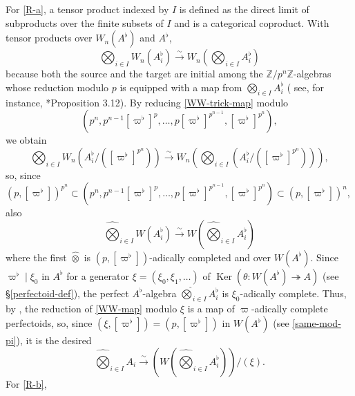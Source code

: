 \documentclass[11pt, reqno]{amsart}
\newcommand{\bZ}{\mathbb{Z}}
\DeclareMathOperator{\Ker}{Ker}		%
\newcommand{\isomto}{\overset{\sim}{\longrightarrow}}
\newcommand{\surjects}{\twoheadrightarrow}
\newcommand{\tensor}{\otimes} 			%
\newcommand{\wh}{\widehat}
\newcommand{\tst}{\textstyle}
\newcommand{\be}{\begin{equation}}
\newcommand{\ee}{\end{equation}}
\numberwithin{equation}{numberingbase}
\theoremstyle{thms}
\theoremstyle{claims}
\theoremstyle{defs}
\theoremstyle{thms}
\theoremstyle{defs}
\theoremstyle{subsection-tweak}
\theoremstyle{subsection-tweak}
\begin{document}
For \ref{R-a}, a tensor product indexed by $I$ is defined as the direct limit of subproducts over the finite subsets of $I$  and is a categorical coproduct. With tensor products over $W_n(A^\flat)$ and $A^\flat$, %
\be \label{WW-trick-map}
\tst \bigotimes_{i \in I} W_n(A_i^\flat) \isomto W_n(\bigotimes_{i \in I} A_i^\flat)
\ee
because both the source and the target are initial among the $\bZ/p^n\bZ$-algebras whose reduction modulo $p$ is equipped with a map from $ \bigotimes_{i \in I} A_i^\flat$ (%
see, for instance, \cite{SZ18}*{Proposition 3.12}). By reducing \eqref{WW-trick-map} modulo 
\[
(p^n, p^{n - 1}[\varpi^\flat]^{p}, \dotsc, p [\varpi^\flat]^{p^{n - 1}}, [\varpi^\flat]^{p^{n}}),
\]
we obtain
\[
\tst \bigotimes_{i \in I} W_n(A_i^\flat/([\varpi^\flat]^{p^{n}})) \isomto W_n(\bigotimes_{i \in I} (A_i^\flat/([\varpi^\flat]^{p^{n}}))),
\]
so, since $(p, [\varpi^\flat])^{p^n} \subset (p^n, p^{n - 1}[\varpi^\flat]^{p}, \dotsc, p [\varpi^\flat]^{p^{n - 1}}, [\varpi^\flat]^{p^{n}}) \subset (p, [\varpi^\flat])^n$, also %
\be \label{WW-map}
\tst  \wh{\bigotimes}_{i \in I} W(A_i^\flat) \isomto W(\wh{\bigotimes}_{i \in I} A_i^\flat)
\ee
where the first $\wh{\tensor}$ is $(p, [\varpi^\flat])$-adically completed and over $W(A^\flat)$. %
Since $\varpi^\flat \mid \xi_0$ in $A^\flat$ for a generator $\xi = (\xi_0, \xi_1, \dotsc)$ of $\Ker(\theta\colon W(A^\flat) \surjects A)$ (see \S\ref{perfectoid-def}), the perfect $A^\flat$-algebra $\wh{\bigotimes}_{i \in I} A_i^\flat$ is $\xi_0$-adically complete. Thus, by , %
the reduction of  \eqref{WW-map} modulo $\xi$ is a map of $\varpi$-adically complete perfectoids, so, since $(\xi, [\varpi^\flat]) = (p, [\varpi^\flat])$ in $W(A^\flat)$ (see \eqref{same-mod-pi}), it is %
the desired
\[
\tst \wh{\bigotimes}_{i \in I} A_i \isomto (W(\wh{\bigotimes}_{i \in I} A_i^\flat))/(\xi).
\]
For \ref{R-b}, %
\end{document}
